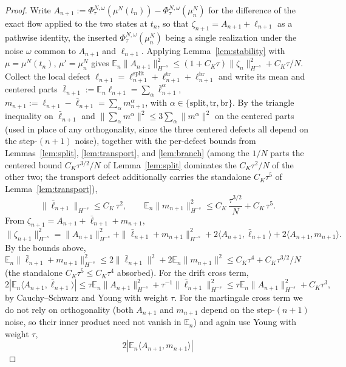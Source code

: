 \documentclass[a4paper,fleqn]{cas-sc}
\theoremstyle{definition}
\theoremstyle{remark}
\begin{document}
\begin{proof}
Write $A_{n+1}:=\Phi^{N,\omega}_\tau(\mu^N(t_n))-\Phi^{N,\omega}_\tau(\mu^N_n)$ for
the difference of the exact flow applied to the two states at $t_n$, so that
$\zeta_{n+1}=A_{n+1}+\ell_{n+1}$ as a pathwise identity, the inserted
$\Phi^{N,\omega}_\tau(\mu^N_n)$ being a single realization under the noise $\omega$
common to $A_{n+1}$ and $\ell_{n+1}$. Applying Lemma~\ref{lem:stability} with
$\mu=\mu^N(t_n)$, $\mu'=\mu^N_n$ gives
$\mathbb E_n\|A_{n+1}\|_{H^{-s}}^2\le(1+C_K\tau)\|\zeta_n\|_{H^{-s}}^2+C_K\tau/N$.
Collect the local defect $\ell_{n+1}=\ell^{\mathrm{split}}_{n+1}
+\ell^{\mathrm{tr}}_{n+1}+\ell^{\mathrm{br}}_{n+1}$
and write its mean and centered parts $\bar\ell_{n+1}:=\mathbb E_n\ell_{n+1}
=\sum_\alpha\bar\ell^\alpha_{n+1}$, $m_{n+1}:=\ell_{n+1}-\bar\ell_{n+1}
=\sum_\alpha m^\alpha_{n+1}$, with $\alpha\in\{\mathrm{split},\mathrm{tr},\mathrm{br}\}$.
By the triangle inequality on $\bar\ell_{n+1}$ and $\|\sum_\alpha m^\alpha\|^2
\le3\sum_\alpha\|m^\alpha\|^2$ on the centered parts (used in place of any
orthogonality, since the three centered defects all depend on the
step-$(n{+}1)$ noise), together with the per-defect bounds from
Lemmas~\ref{lem:split}, \ref{lem:transport}, and \ref{lem:branch} (among the
$1/N$ parts the centered bound $C_K\tau^{3/2}/N$ of Lemma~\ref{lem:split} dominates the
$C_K\tau^2/N$ of the other two; the transport defect additionally carries the
standalone $C_K\tau^5$ of Lemma~\ref{lem:transport}),
\[
\|\bar\ell_{n+1}\|_{H^{-s}}\le C_K\,\tau^2,
\qquad
\mathbb E_n\|m_{n+1}\|_{H^{-s}}^2\le C_K\,\frac{\tau^{3/2}}{N}+C_K\,\tau^5.
\]
From $\zeta_{n+1}=A_{n+1}+\bar\ell_{n+1}+m_{n+1}$,
\[
\|\zeta_{n+1}\|_{H^{-s}}^2
=\|A_{n+1}\|_{H^{-s}}^2+\|\bar\ell_{n+1}+m_{n+1}\|_{H^{-s}}^2
+2\langle A_{n+1},\bar\ell_{n+1}\rangle+2\langle A_{n+1},m_{n+1}\rangle.
\]
By the bounds above,
$\mathbb E_n\|\bar\ell_{n+1}+m_{n+1}\|_{H^{-s}}^2\le 2\|\bar\ell_{n+1}\|^2
+2\mathbb E_n\|m_{n+1}\|^2\le C_K\tau^4+C_K\tau^{3/2}/N$ (the standalone
$C_K\tau^5\le C_K\tau^4$ absorbed). For the drift cross term,
\[
2|\mathbb E_n\langle A_{n+1},\bar\ell_{n+1}\rangle|
\le\tau\mathbb E_n\|A_{n+1}\|_{H^{-s}}^2+\tau^{-1}\|\bar\ell_{n+1}\|_{H^{-s}}^2
\le\tau\mathbb E_n\|A_{n+1}\|_{H^{-s}}^2+C_K\tau^3,
\]
by Cauchy--Schwarz and Young with weight $\tau$. For the martingale cross term we
do not rely on orthogonality (both $A_{n+1}$ and $m_{n+1}$ depend on the
step-$(n{+}1)$ noise, so their inner product need not vanish in $\mathbb E_n$) and
again use Young with weight $\tau$,
\[
2|\mathbb E_n\langle A_{n+1},m_{n+1}\rangle|
\]
\end{proof}
\end{document}
